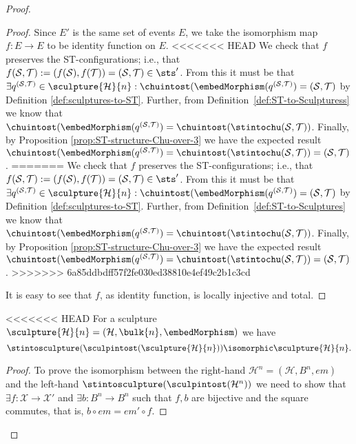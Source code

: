 \begin{proof}
\begin{proof}
        Since $E'$ is the same set of events $E$, we take the isomorphism map $f: E \rightarrow E$ to be identity function on $E$.
<<<<<<< HEAD
        We check that $f$ preserves the ST-configurations; i.e., that $f(\mathcal{S}, \mathcal{T}):=( f(\mathcal{S}), f(\mathcal{T})) = (\mathcal{S}, \mathcal{T}) \in \sts'$. From this it must be that $\exists q^{(\mathcal{S},\mathcal{T})}\in\sculpture{\mathcal{H}}{n}: \chuintost(\embedMorphism(q^{(\mathcal{S},\mathcal{T})}) = (\mathcal{S},\mathcal{T})$ by Definition \ref{def:sculptures-to-ST}. Further, from Definition~\ref{def:ST-to-Sculpturess} we know that $\chuintost(\embedMorphism(q^{(\mathcal{S},\mathcal{T})}) = \chuintost(\stintochu(\mathcal{S},\mathcal{T}))$. Finally, by Proposition \ref{prop:ST-structure-Chu-over-3} we have the expected result $\chuintost(\embedMorphism(q^{(\mathcal{S},\mathcal{T})}) = \chuintost(\stintochu(\mathcal{S},\mathcal{T})) = (\mathcal{S},\mathcal{T})$.
=======
        We check that $f$ preserves the ST-configurations; i.e., that $f(\mathcal{S}, \mathcal{T}):=( f(\mathcal{S}), f(\mathcal{T})) = (\mathcal{S}, \mathcal{T}) \in \sts'$. From this it must be that $\exists q^{(\mathcal{S},\mathcal{T})}\in\sculpture{\mathcal{H}}{n}: \chuintost(\embedMorphism(q^{(\mathcal{S},\mathcal{T})}) = (\mathcal{S},\mathcal{T})$ by Definition \ref{def:sculptures-to-ST}. Further, from Definition~\ref{def:ST-to-Sculptures} we know that $\chuintost(\embedMorphism(q^{(\mathcal{S},\mathcal{T})}) = \chuintost(\stintochu(\mathcal{S},\mathcal{T}))$. Finally, by Proposition \ref{prop:ST-structure-Chu-over-3} we have the expected result $\chuintost(\embedMorphism(q^{(\mathcal{S},\mathcal{T})}) = \chuintost(\stintochu(\mathcal{S},\mathcal{T})) = (\mathcal{S},\mathcal{T})$.
>>>>>>> 6a85ddbdff57f2fe030ed38810e4ef49c2b1c3cd

        It is easy to see that $f$, as identity function, is locally injective and total.
    \end{proof}

    \begin{proposition}
        \label{prop:Sculpture-to-ST}
<<<<<<< HEAD
    For a sculpture $\sculpture{\mathcal{H}}{n}=(\mathcal{H},\bulk{n},\embedMorphism)$ we have
        \[
        \stintosculpture(\sculpintost(\sculpture{\mathcal{H}}{n})) \isomorphic \sculpture{\mathcal{H}}{n}.
        \]
    \end{proposition}

    \begin{proof}
        To prove the isomorphism between the right-hand $\mathcal{H}^{n}=(\mathcal{H},B^{n}, em)$ and the left-hand $\stintosculpture(\sculpintost(\mathcal{H}^{n}))$ we need to show that $\exists f: \mathcal{X} \rightarrow \mathcal{X}'$ and $\exists b:B^{n} \rightarrow B^{n}$ such that $f,b$ are bijective and the square commutes, that is, $b \circ em = em' \circ f$.
    

\end{proof}
\end{proof}
